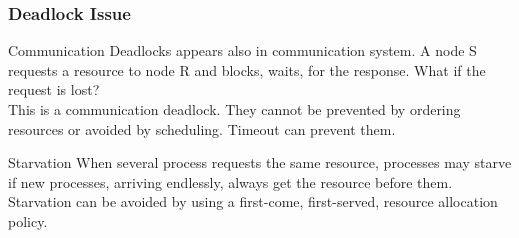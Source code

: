 \begin{frame}
  \frametitle{Deadlock Issue}
  \begin{block}{Communication}
    Deadlocks appears also in communication system. A node S requests a resource to node R and blocks, waits, for the response. What if the request is lost?\\
    This is a communication deadlock. They cannot be prevented by ordering resources or avoided by scheduling. Timeout can prevent them.
  \end{block}
  \begin{block}{Starvation}
    When several process requests the same resource, processes may starve if new processes, arriving endlessly, always get the resource before them.\\
    Starvation can be avoided by using a first-come, first-served, resource allocation policy.
  \end{block}
\end{frame}
